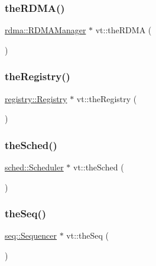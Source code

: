 \mbox{\label{namespacevt_a68b8410bc2b86d3b5228d7dbb6b40bac}} 
\subsubsection{\texorpdfstring{the\+R\+D\+M\+A()}{theRDMA()}}
{\footnotesize\ttfamily \hyperlink{structvt_1_1rdma_1_1_r_d_m_a_manager}{rdma\+::\+R\+D\+M\+A\+Manager} $\ast$ vt\+::the\+R\+D\+MA (\begin{DoxyParamCaption}{ }\end{DoxyParamCaption})}

\mbox{\label{namespacevt_a8b5994a5aedabc64006ce820db2e938c}} 
\subsubsection{\texorpdfstring{the\+Registry()}{theRegistry()}}
{\footnotesize\ttfamily \hyperlink{structvt_1_1registry_1_1_registry}{registry\+::\+Registry} $\ast$ vt\+::the\+Registry (\begin{DoxyParamCaption}{ }\end{DoxyParamCaption})}

\mbox{\label{namespacevt_a4508b38e6ab664b64f1415aecbb83571}} 
\subsubsection{\texorpdfstring{the\+Sched()}{theSched()}}
{\footnotesize\ttfamily \hyperlink{structvt_1_1sched_1_1_scheduler}{sched\+::\+Scheduler} $\ast$ vt\+::the\+Sched (\begin{DoxyParamCaption}{ }\end{DoxyParamCaption})}

\mbox{\label{namespacevt_a4a7d07c845b311da59286de486d623c7}} 
\subsubsection{\texorpdfstring{the\+Seq()}{theSeq()}}
{\footnotesize\ttfamily \hyperlink{structvt_1_1seq_1_1_sequencer}{seq\+::\+Sequencer} $\ast$ vt\+::the\+Seq (\begin{DoxyParamCaption}{ }\end{DoxyParamCaption})}

